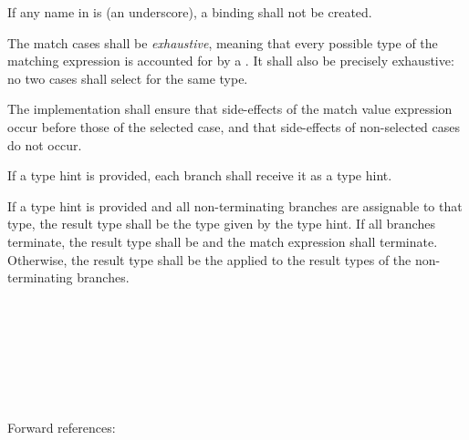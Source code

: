 \specsubsubitem
If any name in  is \terminal{\_} (an underscore), a
binding shall not be created.

\specsubsubitem
The match cases shall be \textit{exhaustive}, meaning that every possible type
of the matching expression is accounted for by a . It
shall also be precisely exhaustive: no two cases shall select for the same
type.

\specsubsubitem
The implementation shall ensure that side-effects of the match value
expression occur before those of the selected case, and that side-effects of
non-selected cases do not occur.

\specsubsubitem
If a type hint is provided, each branch shall receive it as a type hint.

\specsubsubitem
If a type hint is provided and all non-terminating branches are assignable to
that type, the result type shall be the type given by the type hint. If all
branches terminate, the result type shall be  and the match
expression shall terminate. Otherwise, the result type shall be the
 applied to the result types of the
non-terminating branches.



\begin{grammar}
 \\
	   \\
	\terminal{*}    \\
	 \terminal{=}  \\
	\terminal{(}  \terminal{)} \terminal{=}  \\

 \oneof \\
	\terminal{=}
	\terminal{+=}
	\terminal{-=}
	\terminal{*=}
	\terminal{/=}
	\terminal{\%=}
	\terminal{\textless{}\textless{}=}
	\terminal{\textgreater{}\textgreater{}=}
	\terminal{\&=}
	\terminal{|=}
	\terminal{\textasciicircum=}
	\terminal{\&\&=}
	\terminal{||=}
	\terminal{\textasciicircum\textasciicircum=}
\end{grammar}

Forward references: 

